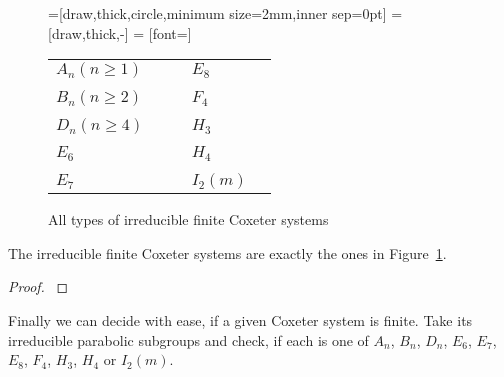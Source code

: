 \begin{figure}
	\centering
	=[draw,thick,circle,minimum size=2mm,inner sep=0pt]
	 = [draw,thick,-]
	 = [font=\small]

	\begin{tabular}{MMcMM}
	$A_n (n \geq 1)$
	&
	\An
	&
	\hspace*{\cgpadh}
	&
	$E_8$
	&
	\Eeight
	\\
	\vspace*{\cgpadv}
	\\
	$B_n (n \geq 2)$
	&
	\Bn
	&
	\hspace*{\cgpadh}
	&
	$F_4$
	&
	\Ffour
	\\
	\vspace*{\cgpadv}
	\\
	$D_n (n \geq 4)$
	&
	\Dn
	&
	\hspace*{\cgpadh}
	&
	$H_3$
	&
	\Hthree
	\\
	\vspace*{\cgpadv}
	\\
	$E_6$
	&
	\Esix
	&
	\hspace*{\cgpadh}
	&
	$H_4$
	&
	\Hfour
	\\
	\vspace*{\cgpadv}
	\\
	$E_7$
	&
	\Eseven
	&
	\hspace*{\cgpadh}
	&
	$I_2(m)$
	&
	\Itwom
	\end{tabular}
	\caption{All types of irreducible finite Coxeter systems}
	\label{fig:finite-coxeter-systems}
\end{figure}

\begin{theo}
	The irreducible finite Coxeter systems are exactly the ones in Figure~\ref{fig:finite-coxeter-systems}.

	\begin{proof}
		\cite[Theorem 6.4]{humphreys:coxeter}
	\end{proof}
\end{theo}

Finally we can decide with ease, if a given Coxeter system is finite. Take its irreducible parabolic subgroups and check, if each is one of $A_n$, $B_n$, $D_n$, $E_6$, $E_7$, $E_8$, $F_4$, $H_3$, $H_4$ or $I_2(m)$.